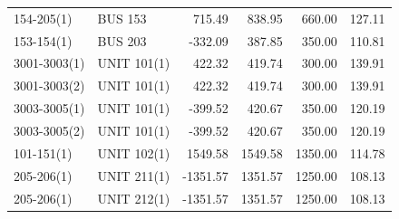 \documentclass[10pt]{report}
\begin{document}
\begin{table}[H]
{\begin{tabular}{llrrrr}
154-205(1) & BUS 153 & 715.49 & 838.95 & 660.00 & 127.11 \\
153-154(1) & BUS 203 & -332.09 & 387.85 & 350.00 & 110.81 \\
3001-3003(1) & UNIT 101(1) & 422.32 & 419.74 & 300.00 & 139.91 \\
3001-3003(2) & UNIT 101(1) & 422.32 & 419.74 & 300.00 & 139.91 \\
3003-3005(1) & UNIT 101(1) & -399.52 & 420.67 & 350.00 & 120.19 \\
3003-3005(2) & UNIT 101(1) & -399.52 & 420.67 & 350.00 & 120.19 \\
101-151(1) & UNIT 102(1) & 1549.58 & 1549.58 & 1350.00 & 114.78 \\
205-206(1) & UNIT 211(1) & -1351.57 & 1351.57 & 1250.00 & 108.13 \\
205-206(1) & UNIT 212(1) & -1351.57 & 1351.57 & 1250.00 & 108.13 \\
\bottomrule
\end{tabular}}
\end{table}
\end{document}
